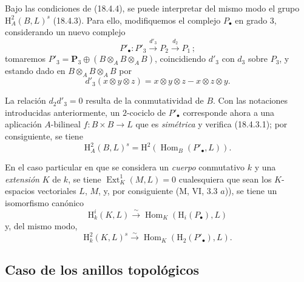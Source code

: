 \begin{env}[18.4.5]
\label{0.18.4.5-es}
Bajo las condiciones de (18.4.4), se puede interpretar del mismo modo el
grupo $\mathrm H_A^2(B,L)^s$ (18.4.3). Para ello, modifiquemos el complejo
$P_\bullet$ en grado $3$, considerando un nuevo complejo
\[
  P'_\bullet:P'_3\xrightarrow{d'_3}P_2
  \xrightarrow{d_2}P_1\,;
\]
tomaremos
$P'_3=\mathbf P_3\oplus(B\otimes_A B\otimes_A B)$, coincidiendo
$d'_3$ con $d_3$ sobre $P_3$, y estando dado en
$B\otimes_A B\otimes_A B$ por
\[
  d'_3(x\otimes y\otimes z)=x\otimes y\otimes z-x\otimes z\otimes y.
\]

La relación $d_2d'_3=0$ resulta de la conmutatividad de $B$. Con las notaciones
introducidas anteriormente, un $2$-cociclo de $P'_\bullet$ corresponde
ahora a una aplicación $A$-bilineal $f:B\times B\to L$ que es
\emph{simétrica} y verifica (18.4.3.1); por consiguiente, se tiene
\[
  \mathrm H_A^2(B,L)^s
  =\mathrm H^2(\operatorname{Hom}_B(P'_\bullet,L)).
\]
\end{env}

\begin{env}[18.4.6]
\label{0.18.4.6-es}
En el caso particular en que se considera un \emph{cuerpo} conmutativo $k$ y
una \emph{extensión} $K$ de $k$, se tiene
$\operatorname{Ext}_K^1(M,L)=0$ cualesquiera que sean los $K$-espacios
vectoriales $L$, $M$, y, por consiguiente (M, VI, 3.3 $a$)), se tiene un
isomorfismo canónico
\begin{equation}
\label{0.18.4.6.1-es}
\tag{18.4.6.1}
  \mathrm H_k^i(K,L)\xrightarrow{\sim}
  \operatorname{Hom}_K(\mathrm H_i(P_\bullet),L)
\end{equation}
y, del mismo modo,
\begin{equation}
\label{0.18.4.6.2-es}
\tag{18.4.6.2}
  \mathrm H_k^2(K,L)^s\xrightarrow{\sim}
  \operatorname{Hom}_K(\mathrm H_2(P'_\bullet),L).
\end{equation}
\end{env}

\subsection{Caso de los anillos topológicos}
\label{subsection:0.18.5-es}

